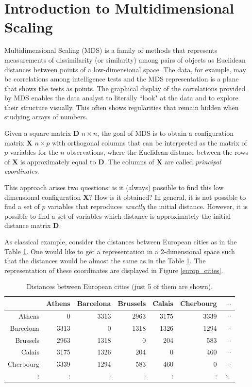 \documentclass[11pt]{report}
\begin{document}
\section{Introduction to Multidimensional Scaling}
Multidimensional Scaling (MDS) is a family of methods that represents 
measurements of dissimilarity (or similarity) among pairs of objects as 
Euclidean distances between points of a low-dimensional space. The data, 
for example, may be correlations among intelligence tests and the MDS 
representation is a plane that shows the tests as points. The graphical display 
of the correlations provided by MDS enables the data analyst to literally 
``look" at the data and to explore their structure visually. This often shows 
regularities that remain hidden when studying arrays of numbers. 

\indent Given a square matrix \textbf{D} $n\times n$, the goal of MDS is to 
obtain a configuration matrix \textbf{X} $n \times p$ with orthogonal columns
that can be interpreted as the matrix of $p$ variables for the $n$ 
observations, where the Euclidean distance between the rows of \textbf{X} 
is approximately equal to \textbf{D}. The columns of \textbf{X} are called 
\textit{principal coordinates}.

\indent This approach arises two questions: is it (always) possible to find this
low dimensional configuration \textbf{X}? How is it obtained? In general, it 
is not possible to find a set of $p$ variables that reproduces 
\textit{exactly} the initial distance. However, it is possible to find a set 
of variables which distance is approximately the initial distance matrix 
\textbf{D}.


\indent As classical example, consider the distances between European cities as
in the Table \ref{european_distances}. One would like to get a representation in
a 2-dimensional space such that the distances would be almost the same as in the 
Table \ref{european_distances}. The representation of these coordinates are 
displayed in Figure \ref{europ_cities}.

\begin{table}[ht]
\centering
\begin{tabular}{rrrrrrr}
 & Athens & Barcelona & Brussels & Calais & Cherbourg & $\dotsi$ \\ 
  \hline
Athens & 0 & 3313 & 2963 & 3175 & 3339 & $\dotsi$ \\ 
  Barcelona & 3313 & 0& 1318 & 1326 & 1294 & $\dotsi$ \\ 
  Brussels & 2963 & 1318 & 0 & 204 & 583 & $\dotsi$ \\ 
  Calais & 3175 & 1326 & 204 & 0 & 460 & $\dotsi$ \\ 
  Cherbourg & 3339 & 1294 & 583 & 460 & 0 & $\dotsi$ \\
  $\vdots$ & $\vdots$ & $\vdots$ & $\vdots$ & $\vdots$ & $\vdots$ & $\ddots$ \\
   \hline
\end{tabular}
\caption{Distances between European cities (just 5 of them are shown).} 
\label{european_distances}
\end{table}
\end{document}

